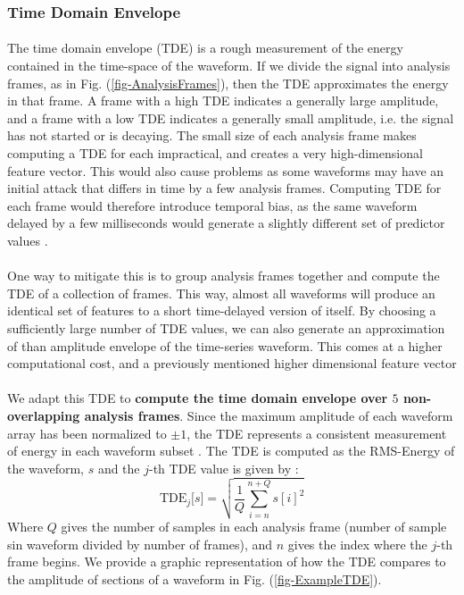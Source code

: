 \documentclass[12pt,letterpaper]{article}
\begin{document}

\subsubsection{Time Domain Envelope}

\paragraph*{}The time domain envelope (TDE) is a rough measurement of the energy contained in the time-space of the waveform. If we divide the signal into analysis frames, as in Fig. (\ref{fig-AnalysisFrames}), then the TDE approximates the energy in that frame. A frame with a high TDE indicates a generally large amplitude, and a frame with a low TDE indicates a generally small amplitude, i.e. the signal has not started or is decaying. The small size of each analysis frame makes computing a TDE for each impractical, and creates a very high-dimensional feature vector. This would also cause problems as some waveforms may have an initial attack that differs in time by a few analysis frames. Computing TDE for each frame would therefore introduce temporal bias, as the same waveform delayed by a few milliseconds would generate a slightly different set of predictor values \cite{Serizel}. 

\paragraph*{}One way to mitigate this is to group analysis frames together and compute the TDE of a collection of frames. This way,  almost all waveforms will produce an identical set of features to a short time-delayed version of itself. By choosing a sufficiently large number of TDE values, we can also generate an approximation of than amplitude envelope of the time-series waveform. This comes at a higher computational cost, and a previously mentioned higher dimensional feature vector

\paragraph*{}We adapt this TDE to \textbf{compute the time domain envelope over $5$ non-overlapping analysis frames}. Since the maximum amplitude of each waveform array has been normalized to $\pm 1$, the TDE represents a consistent measurement of energy in each waveform subset \cite{Liu}. The TDE is computed as the RMS-Energy of the waveform, $s$ and the $j$-th TDE value is given by \cite{Olson,Serizel}:
\begin{equation}
\label{eqn-RMS}
\text{TDE}_j\big[ s \big] = \sqrt{\frac{1}{Q} \sum_{i=n}^{n+Q} s[i]^2}
\end{equation}
Where $Q$ gives the number of samples in each analysis frame (number of sample sin waveform divided by number of frames), and $n$ gives the index where the $j$-th frame begins. We provide a graphic representation of how the TDE compares to the amplitude of sections of a waveform in Fig. (\ref{fig-ExampleTDE}).
\end{document}
